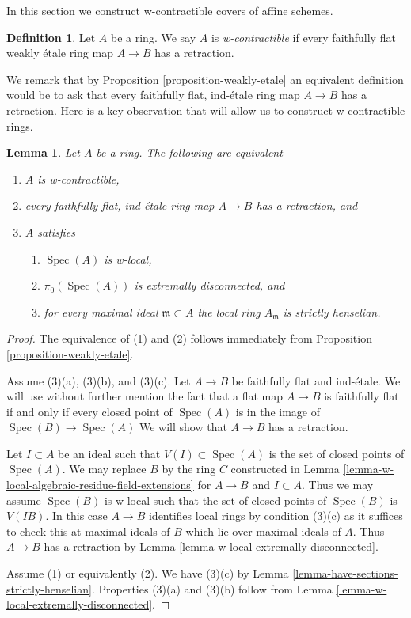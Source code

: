 \documentclass{stacks-project}
\theoremstyle{plain}
\newtheorem{lemma}[subsection]{Lemma}
\theoremstyle{definition}
\newtheorem{definition}[subsection]{Definition}
\theoremstyle{remark}
\numberwithin{equation}{subsection}
\def\Spec{\mathop{\mathrm{Spec}}}
\begin{document}
\noindent
In this section we construct w-contractible covers of affine schemes.

\begin{definition}
\label{definition-w-contractible}
Let $A$ be a ring. We say $A$ is {\it w-contractible} if every
faithfully flat weakly \'etale ring map $A \to B$ has a retraction.
\end{definition}

\noindent
We remark that by Proposition \ref{proposition-weakly-etale}
an equivalent definition would be to ask that every faithfully
flat, ind-\'etale ring map $A \to B$ has a retraction.
Here is a key observation that will allow us to construct
w-contractible rings.

\begin{lemma}
\label{lemma-w-local-strictly-henselian-extremally-disconnected}
Let $A$ be a ring. The following are equivalent
\begin{enumerate}
\item $A$ is w-contractible,
\item every faithfully flat, ind-\'etale ring map $A \to B$ has
a retraction, and
\item $A$ satisfies
\begin{enumerate}
\item $\Spec(A)$ is w-local,
\item $\pi_0(\Spec(A))$ is extremally disconnected, and
\item for every maximal ideal $\mathfrak m \subset A$ the
local ring $A_\mathfrak m$ is strictly henselian.
\end{enumerate}
\end{enumerate}
\end{lemma}

\begin{proof}
The equivalence of (1) and (2) follows immediately from
Proposition \ref{proposition-weakly-etale}.

\medskip\noindent
Assume (3)(a), (3)(b), and (3)(c). Let $A \to B$ be faithfully flat
and ind-\'etale. We will use without further mention the fact that a flat map
$A \to B$ is faithfully flat if and only if every closed point
of $\Spec(A)$ is in the image of $\Spec(B) \to \Spec(A)$
We will show that $A \to B$ has a retraction.

\medskip\noindent
Let $I \subset A$ be an ideal such that $V(I) \subset \Spec(A)$ is
the set of closed points of $\Spec(A)$. 
We may replace $B$ by the ring $C$ constructed in
Lemma \ref{lemma-w-local-algebraic-residue-field-extensions}
for $A \to B$ and $I \subset A$.
Thus we may assume $\Spec(B)$ is w-local such that the set of
closed points of $\Spec(B)$ is $V(IB)$. In this case $A \to B$
identifies local rings by condition (3)(c) as it suffices to check
this at maximal ideals of $B$ which lie over maximal ideals of $A$.
Thus $A \to B$ has a retraction by
Lemma \ref{lemma-w-local-extremally-disconnected}.

\medskip\noindent
Assume (1) or equivalently (2). We have (3)(c) by
Lemma \ref{lemma-have-sections-strictly-henselian}.
Properties (3)(a) and (3)(b) follow from
Lemma \ref{lemma-w-local-extremally-disconnected}.
\end{proof}
\end{document}
